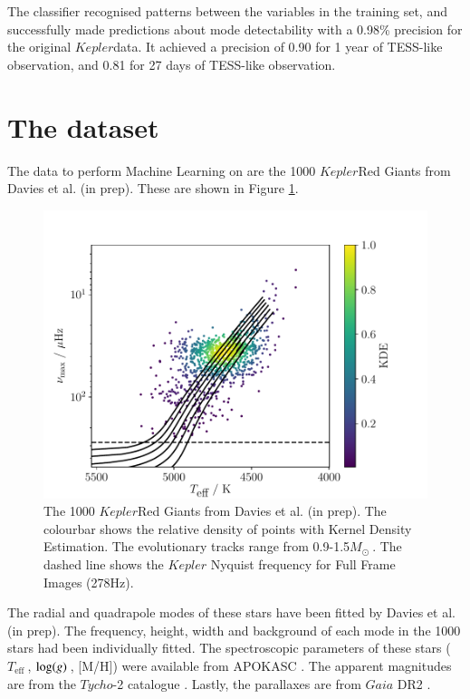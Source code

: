 \documentclass[a4paper,fleqn,usenatbib,useAMS]{mnras}
\newcommand{\teff}{\ensuremath{T_{\textrm{eff}}\:}}
\newcommand{\kep}{\ensuremath{Kepler}\:}
\newcommand{\msol}{\ensuremath{M_{\odot}\:}}
\newcommand{\logg}{\ensuremath{{\rm log}(g)\:}}
\begin{document}
The classifier recognised patterns between the variables in the training set, and successfully made predictions about mode detectability with a 0.98\% precision for the original \kep data. It achieved a precision of 0.90 for 1 year of TESS-like observation, and 0.81 for 27 days of TESS-like observation.
\fi


\section{The dataset}
\label{sect: dataset}

The data to perform Machine Learning on are the 1000 \kep Red Giants from Davies et al. (in prep). These are shown in Figure \ref{fig:dataset}.
\begin{figure}
	\centering
	\includegraphics[scale=0.5]{Plot1_HR.pdf}
	\caption{The 1000 \kep Red Giants from Davies et al. (in prep). The colourbar shows the relative density of points with Kernel Density Estimation. The evolutionary tracks range from 0.9-1.5\msol. The dashed line shows the $Kepler$ Nyquist frequency for Full Frame Images (278Hz).}	
	\label{fig:dataset}
\end{figure}
The radial and quadrapole modes of these stars have been fitted by Davies et al. (in prep). The frequency, height, width and background of each mode in the 1000 stars had been individually fitted. The spectroscopic parameters of these stars (\teff, \logg, [M/H]) were available from APOKASC \citet{pinsonneault_apokasc_2014}. The apparent magnitudes are from the $Tycho$-2 catalogue \citet{hog_tycho-2_2000}. Lastly, the parallaxes are from $Gaia$ DR2 \citet{lindegren_gaia_2018}.
\end{document}
